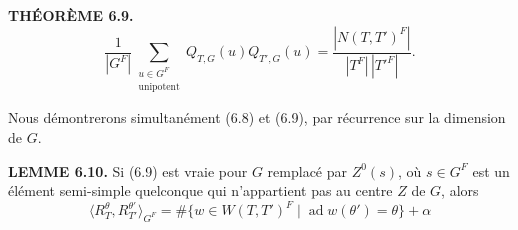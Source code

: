 \documentclass[9pt,twoside]{extarticle}
\begin{document}
{\noindent\textbf{THÉORÈME 6.9.} \[
\tag{6.9.1}
\frac1{|G^F|}\sum_{\substack{u\in G^F\\\text{unipotent}}}Q_{T,G}(u)Q_{T',G}(u)
=
\frac{|N(T,T')^F|}{|T^F|\,|T'^F|}.
\]\par

Nous démontrerons simultanément (6.8) et (6.9), par récurrence sur la dimension de \(G\).\par

\noindent\textbf{LEMME 6.10.} Si (6.9) est vraie pour \(G\) remplacé par \(Z^0(s)\), où \(s\in G^F\) est un élément semi-simple quelconque qui n'appartient pas au centre \(Z\) de \(G\), alors \[
\tag{6.10.1}
\langle R_T^\theta,R_{T'}^{\theta'}\rangle_{G^F}
=
\#\{w\in W(T,T')^F\mid \operatorname{ad}w(\theta')=\theta\}+\alpha
\]\par
}
\end{document}
